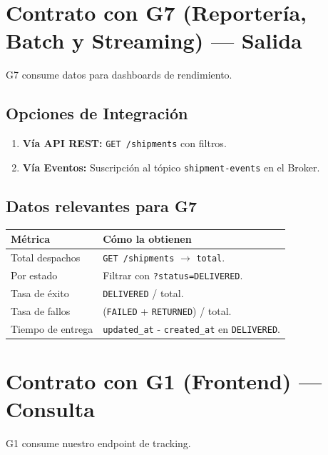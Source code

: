 \documentclass[11pt, a4paper]{article}
\begin{document}
\section{Contrato con G7 (Reportería, Batch y Streaming) --- Salida}

G7 consume datos para dashboards de rendimiento.

\subsection{Opciones de Integración}

\begin{enumerate}[noitemsep]
  \item \textbf{Vía API REST:} \texttt{GET /shipments} con filtros.
  \item \textbf{Vía Eventos:} Suscripción al tópico \texttt{shipment-events} en el Broker.
\end{enumerate}

\subsection{Datos relevantes para G7}

\begin{table}[h!]
\centering
\renewcommand{\arraystretch}{1.3}
\begin{tabularx}{\textwidth}{l X}
  \toprule
  \textbf{Métrica} & \textbf{Cómo la obtienen} \\
  \midrule
  Total despachos       & \texttt{GET /shipments} $\rightarrow$ \texttt{total}. \\
  Por estado            & Filtrar con \texttt{?status=DELIVERED}. \\
  Tasa de éxito         & \texttt{DELIVERED} / total. \\
  Tasa de fallos        & (\texttt{FAILED} + \texttt{RETURNED}) / total. \\
  Tiempo de entrega     & \texttt{updated\_at} - \texttt{created\_at} en \texttt{DELIVERED}. \\
  \bottomrule
\end{tabularx}
\end{table}


\section{Contrato con G1 (Frontend) --- Consulta}

G1 consume nuestro endpoint de tracking.
\end{document}
